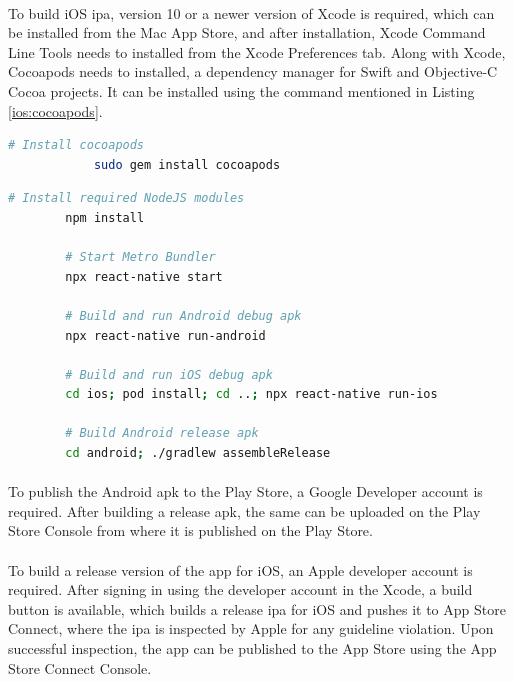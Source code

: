 \documentclass[12pt]{article}
\begin{document}
            \paragraph{}
            To build iOS \acrshort{ipa}, version 10 or a newer version of Xcode is required, which can be installed from the Mac App Store, and after installation, Xcode Command Line Tools needs to installed from the Xcode Preferences tab. Along with Xcode, Cocoapods needs to installed, a dependency manager for Swift and Objective-C Cocoa projects. It can be installed using the command mentioned in Listing \ref{ios:cocoapods}.
        
            \begin{lstlisting}[language=bash, caption=Cocoapods installation, label=ios:cocoapods]
            # Install cocoapods
            sudo gem install cocoapods    
            \end{lstlisting}
        
        \begin{lstlisting}[language=bash, caption=Smartphone Application]
        # Install required NodeJS modules
        npm install
    
        # Start Metro Bundler
        npx react-native start
    
        # Build and run Android debug apk
        npx react-native run-android
        
        # Build and run iOS debug apk
        cd ios; pod install; cd ..; npx react-native run-ios
        
        # Build Android release apk
        cd android; ./gradlew assembleRelease
        \end{lstlisting}
        
        \paragraph{}
        To publish the Android \acrshort{apk} to the Play Store, a Google Developer account is required. After building a release \acrshort{apk}, the same can be uploaded on the Play Store Console from where it is published on the Play Store.
        \paragraph{}
        To build a release version of the app for iOS, an Apple developer account is required. After signing in using the developer account in the Xcode, a build button is available, which builds a release \acrshort{ipa} for iOS and pushes it to App Store Connect, where the \acrshort{ipa} is inspected by Apple for any guideline violation. Upon successful inspection, the app can be published to the App Store using the App Store Connect Console.
    
\end{document}
